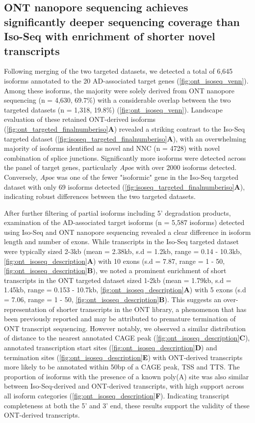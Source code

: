 \newpage
\subsection{ONT nanopore sequencing achieves significantly deeper sequencing coverage than Iso-Seq with enrichment of shorter novel transcripts}

Following merging of the two targeted datasets, we detected a total of 6,645 isoforms annotated to the 20 AD-associated target genes (\cref{fig:ont_isoseq_venn}). Among these isoforms, the majority were solely derived from ONT nanopore sequencing (n = 4,630, 69.7\%) with a considerable overlap between the two targeted datasets (n = 1,318, 19.8\%) (\cref{fig:ont_isoseq_venn}). Landscape evaluation of these retained ONT-derived isoforms (\cref{fig:ont_targeted_finalnumberiso}\textbf{A}) revealed a striking contrast to the Iso-Seq targeted dataset (\cref{fig:isoseq_targeted_finalnumberiso}\textbf{A}), with an overwhelming majority of isoforms identified as novel and NNC (n = 4728) with novel combination of splice junctions. Significantly more isoforms were detected across the panel of target genes, particularly \textit{Apoe} with over 2000 isoforms detected. Conversely, \textit{Apoe} was one of the fewer "isoformic" gene in the Iso-Seq targeted dataset with only 69 isoforms detected (\cref{fig:isoseq_targeted_finalnumberiso}\textbf{A}), indicating robust differences between the two targeted datasets.

After further filtering of partial isoforms including 5' degradation products, examination of the AD-associated target isoforms (n = 5,587 isoforms) detected using Iso-Seq and ONT nanopore sequencing revealed a clear difference in isoform length and number of exons. While transcripts in the Iso-Seq targeted dataset were typically sized 2-3kb (mean = 2.38kb, s.d = 1.2kb, range = 0.14 - 10.3kb, \cref{fig:ont_isoseq_description}\textbf{A}) with 10 exons (s.d = 7.87, range = 1 - 50, \cref{fig:ont_isoseq_description}\textbf{B}), we noted a prominent enrichment of short transcripts in the ONT targeted dataset sized 1-2kb (mean = 1.79kb, s.d = 1.45kb, range = 0.153 - 10.7kb, \cref{fig:ont_isoseq_description}\textbf{A}) with 5 exons (s.d = 7.06, range = 1 - 50, \cref{fig:ont_isoseq_description}\textbf{B}). This suggests an over-representation of shorter transcripts in the ONT library, a phenomenon that has been previously reported and may be attributed to premature termination of ONT transcript sequencing\cite{Byrne2017}. However notably, we observed a similar distribution of distance to the nearest annotated CAGE peak (\cref{fig:ont_isoseq_description}\textbf{C}), annotated transcription start sites (\cref{fig:ont_isoseq_description}\textbf{D}) and termination sites (\cref{fig:ont_isoseq_description}\textbf{E}) with ONT-derived transcripts more likely to be annotated within 50bp of a CAGE peak, TSS and TTS. The proportion of isoforms with the presence of a known poly(A) site was also similar between Iso-Seq-derived and ONT-derived transcripts, with high support across all isoform categories (\cref{fig:ont_isoseq_description}\textbf{F}). Indicating transcript completeness at both the 5' and 3' end, these results support the validity of these ONT-derived transcripts. 

